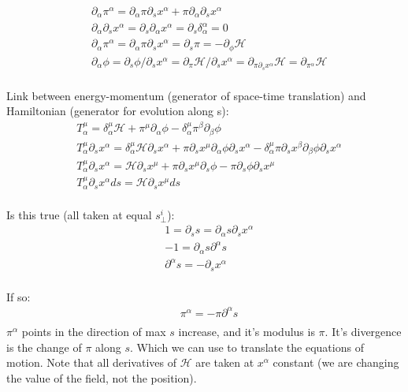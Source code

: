 \documentclass[aps,pra,10pt,twocolumn,floatfix,nofootinbib]{revtex4-1}
\theoremstyle{definition}
\begin{document}
\begin{align*}
&\partial_\alpha\pi^\alpha = \partial_\alpha \pi \partial_s x^\alpha + \pi\partial_\alpha \partial_s x^\alpha \\
&\partial_\alpha \partial_s x^\alpha = \partial_s \partial_\alpha x^\alpha = \partial_s \delta_\alpha^\alpha = 0 \\
&\partial_\alpha\pi^\alpha = \partial_\alpha \pi \partial_s x^\alpha = \partial_s\pi = - \partial_{\phi} \mathcal{H} \\
&\partial_\alpha\phi  = \partial_s \phi / \partial_s x^\alpha = \partial_\pi \mathcal{H} / \partial_s x^\alpha =
\partial_{\pi \partial_s x^\alpha} \mathcal{H} = \partial_{\pi^\alpha} \mathcal{H} \\
\end{align*}

Link between energy-momentum (generator of space-time translation) and Hamiltonian (generator for evolution along s):
\begin{align*}
&T_\alpha^\mu=\delta_\alpha^\mu \mathcal{H} + \pi^\mu \partial_\alpha \phi - \delta_\alpha^\mu \pi^\beta \partial_\beta \phi \\
&T_\alpha^\mu \partial_s x^\alpha = \delta_\alpha^\mu \mathcal{H} \partial_s x^\alpha + \pi \partial_s x^\mu \partial_\alpha \phi \partial_s x^\alpha - \delta_\alpha^\mu \pi \partial_s x^\beta \partial_\beta \phi \partial_s x^\alpha \\
&T_\alpha^\mu \partial_s x^\alpha = \mathcal{H} \partial_s x^\mu + \pi \partial_s x^\mu \partial_s \phi - \pi \partial_s \phi \partial_s x^\mu \\
&T_\alpha^\mu \partial_s x^\alpha ds = \mathcal{H} \partial_s x^\mu ds \\
\end{align*}


Is this true (all taken at equal $s_\perp^i$):
\begin{align*}
&1 = \partial_s s  = \partial_\alpha s \partial_s x^\alpha \\
&-1 = \partial_\alpha s \partial^\alpha s \\
&\partial^\alpha s = -\partial_s x^\alpha \\
\end{align*}

If so:
\begin{align*}
&\pi^\alpha = -\pi\partial^\alpha s \\
\end{align*}
$\pi^\alpha$ points in the direction of max $s$ increase, and it's modulus is $\pi$. It's divergence is the change of $\pi$ along $s$. Which we can use to translate the equations of motion. Note that all derivatives of $\mathcal{H}$ are taken at $x^\alpha$ constant (we are changing the value of the field, not the position).
\end{document}
